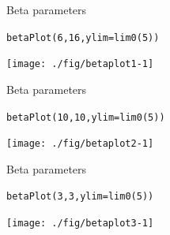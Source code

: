\documentclass[xcolor=table,       handout,    xcolor=dvipsnames]{beamer}\usepackage[]{graphicx}\usepackage[]{color}
\makeatletter
\newcommand{\hlnum}[1]{\textcolor[rgb]{0,0,0}{#1}}
\newcommand{\hlstd}[1]{\textcolor[rgb]{0,0,0}{#1}}
\newcommand{\hlkwc}[1]{\textcolor[rgb]{1,0,1}{#1}}
\newcommand{\hlkwd}[1]{\textcolor[rgb]{0,0,1}{#1}}
\newenvironment{kframe}{%
 \def\at@end@of@kframe{}%
 \ifinner\ifhmode%
  \def\at@end@of@kframe{\end{minipage}}%
  \begin{minipage}{\columnwidth}%
 \fi\fi%
 \def\FrameCommand##1{\hskip\@totalleftmargin \hskip-\fboxsep
 \colorbox{shadecolor}{##1}\hskip-\fboxsep
     \hskip-\linewidth \hskip-\@totalleftmargin \hskip\columnwidth}%
 \MakeFramed {\advance\hsize-\width
   \@totalleftmargin\z@ \linewidth\hsize
   \@setminipage}}%
 {\par\unskip\endMakeFramed%
 \at@end@of@kframe}
\newenvironment{knitrout}{}{} %
\makeatother
\begin{document}

\begin{frame}[fragile]{Beta parameters}
\begin{knitrout}
\color{fgcolor}\begin{kframe}
\begin{alltt}
\hlkwd{betaPlot}\hlstd{(}\hlnum{6}\hlstd{,} \hlnum{16}\hlstd{,} \hlkwc{ylim}\hlstd{=}\hlkwd{lim0}\hlstd{(}\hlnum{5}\hlstd{))}
\end{alltt}
\end{kframe}

{\centering \texttt{[image: ./fig/betaplot1-1]} 

}



\end{knitrout}
\end{frame}


\begin{frame}[fragile]{Beta parameters}
\begin{knitrout}
\color{fgcolor}\begin{kframe}
\begin{alltt}
\hlkwd{betaPlot}\hlstd{(}\hlnum{10}\hlstd{,} \hlnum{10}\hlstd{,} \hlkwc{ylim}\hlstd{=}\hlkwd{lim0}\hlstd{(}\hlnum{5}\hlstd{))}
\end{alltt}
\end{kframe}

{\centering \texttt{[image: ./fig/betaplot2-1]} 

}



\end{knitrout}
\end{frame}


\begin{frame}[fragile]{Beta parameters}
\begin{knitrout}
\color{fgcolor}\begin{kframe}
\begin{alltt}
\hlkwd{betaPlot}\hlstd{(}\hlnum{3}\hlstd{,} \hlnum{3}\hlstd{,} \hlkwc{ylim}\hlstd{=}\hlkwd{lim0}\hlstd{(}\hlnum{5}\hlstd{))}
\end{alltt}
\end{kframe}

{\centering \texttt{[image: ./fig/betaplot3-1]} 

}



\end{knitrout}
\end{frame}
\end{document}
